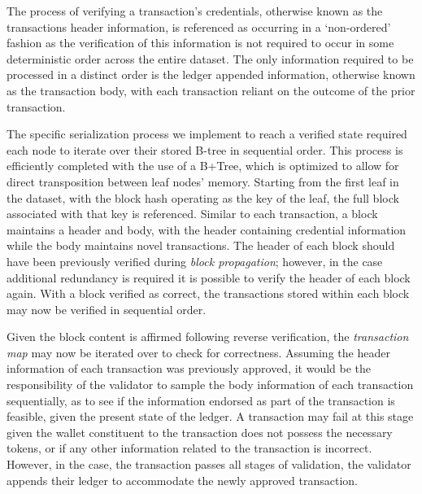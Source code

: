 The process of verifying a transaction's credentials, otherwise known as the transactions header information, is referenced as occurring in a ‘non-ordered’ fashion as the verification of this information is not required to occur in some deterministic order across the entire dataset. The only information required to be processed in a distinct order is the ledger appended information, otherwise known as the transaction body, with each transaction reliant on the outcome of the prior transaction.

The specific serialization process we implement to reach a verified state required each node to iterate over their stored B-tree in sequential order. This process is efficiently completed with the use of a B+Tree, which is optimized to allow for direct transposition between leaf nodes' memory. Starting from the first leaf in the dataset, with the block hash operating as the key of the leaf, the full block associated with that key is referenced. Similar to each transaction, a block maintains a header and body, with the header containing credential information while the body maintains novel transactions. The header of each block should have been previously verified during \textit{block propagation}; however, in the case additional redundancy is required it is possible to verify the header of each block again. With a block verified as correct, the transactions stored within each block may now be verified in sequential order.

Given the block content is affirmed following reverse verification, the \textit{transaction map} may now be iterated over to check for correctness. Assuming the header information of each transaction was previously approved, it would be the responsibility of the validator to sample the body information of each transaction sequentially, as to see if the information endorsed as part of the transaction is feasible, given the present state of the ledger. A transaction may fail at this stage given the wallet constituent to the transaction does not possess the necessary tokens, or if any other information related to the transaction is incorrect. However, in the case, the transaction passes all stages of validation, the validator appends their ledger to accommodate the newly approved transaction.

